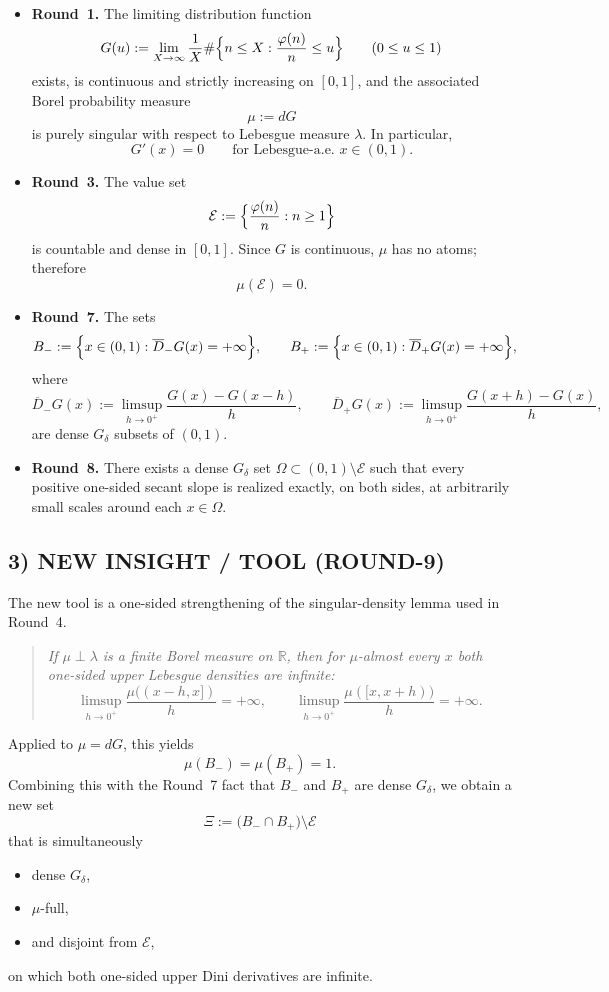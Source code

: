 \begin{itemize}
\item \textbf{Round~1.} The limiting distribution function
\[
G(u):=\lim_{X\to\infty}\frac1X\#\Bigl\{n\le X:\frac{\varphi(n)}n\le u\Bigr\}
\qquad(0\le u\le1)
\]
exists, is continuous and strictly increasing on $[0,1]$, and the associated Borel probability measure
\[
\mu:=dG
\]
is purely singular with respect to Lebesgue measure $\lambda$. In particular,
\[
G'(x)=0\qquad\text{for Lebesgue-a.e. }x\in(0,1).
\]

\item \textbf{Round~3.} The value set
\[
\mathcal E:=\Bigl\{\frac{\varphi(n)}{n}:n\ge1\Bigr\}
\]
is countable and dense in $[0,1]$. Since $G$ is continuous, $\mu$ has no atoms; therefore
\[
\mu(\mathcal E)=0.
\]

\item \textbf{Round~7.} The sets
\[
B_-:=\Bigl\{x\in(0,1):\overline D_-G(x)=+\infty\Bigr\},
\qquad
B_+:=\Bigl\{x\in(0,1):\overline D_+G(x)=+\infty\Bigr\},
\]
where
\[
\overline D_-G(x):=\limsup_{h\to0^+}\frac{G(x)-G(x-h)}{h},
\qquad
\overline D_+G(x):=\limsup_{h\to0^+}\frac{G(x+h)-G(x)}{h},
\]
are dense $G_\delta$ subsets of $(0,1)$.

\item \textbf{Round~8.} There exists a dense $G_\delta$ set $\Omega\subset (0,1)\setminus\mathcal E$ such that every positive one-sided secant slope is realized exactly, on both sides, at arbitrarily small scales around each $x\in\Omega$.
\end{itemize}

\subsection{3) NEW INSIGHT / TOOL (ROUND-9)}

The new tool is a one-sided strengthening of the singular-density lemma used in Round~4.

\begin{quote}
\emph{If $\mu\perp\lambda$ is a finite Borel measure on $\mathbb R$, then for $\mu$-almost every $x$ both one-sided upper Lebesgue densities are infinite:}
\[
\limsup_{h\to0^+}\frac{\mu((x-h,x])}{h}=+\infty,
\qquad
\limsup_{h\to0^+}\frac{\mu([x,x+h))}{h}=+\infty.
\]
\end{quote}

Applied to $\mu=dG$, this yields
\[
\mu(B_-)=\mu(B_+)=1.
\]
Combining this with the Round~7 fact that $B_-$ and $B_+$ are dense $G_\delta$, we obtain a new set
\[
\Xi:=\bigl(B_-\cap B_+\bigr)\setminus\mathcal E
\]
that is simultaneously
\begin{itemize}
\item dense $G_\delta$,
\item $\mu$-full,
\item and disjoint from $\mathcal E$,
\end{itemize}
on which both one-sided upper Dini derivatives are infinite.


